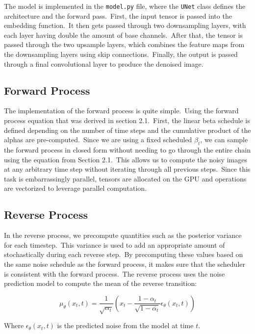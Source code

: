\documentclass[12pt]{article}
\begin{document}
The model is implemented in the \texttt{model.py} file, where the \texttt{UNet} class defines the architecture and the forward pass.\
First, the input tensor is passed into the embedding function.\
It then gets passed through two downsampling layers, with each layer having double the amount of base channels.\
After that, the tensor is passed through the two upsample layers, which combines the feature maps from the downsampling layers using skip connections.\
Finally, the output is passed through a final convolutional layer to produce the denoised image.\

\subsection{Forward Process}

The implementation of the forward process is quite simple.\
Using the forward process equation that was derived in section 2.1.\
First, the linear beta schedule is defined depending on the number of time steps and the cumulative product of the alphas are pre-computed.\
Since we are using a fixed scheduled $\beta_t$, we can sample the forward process in closed form without needing to go through the entire chain using the equation from Section 2.1.\
This allows us to compute the noisy images at any arbitrary time step without iterating through all previous steps.\
Since this task is embarrassingly parallel, tensors are allocated on the GPU and operations are vectorized to leverage parallel computation.\

\subsection{Reverse Process}

In the reverse process, we precompute quantities such as the posterior variance for each timestep.\
This variance is used to add an appropriate amount of stochastically during each reverse step.\
By precomputing these values based on the same noise schedule as the forward process, it makes sure that the scheduler is consistent with the forward process.\
The reverse process uses the noise prediction model to compute the mean of the reverse transition: 

\[{\mu _\theta }({x_t},t) = \frac{1}{{\sqrt {{\alpha _t}} }}({x_t} - \frac{{1 - {\alpha _t}}}{{\sqrt {1 - \overline {{\alpha _t}} } }}{\epsilon _\theta }({x_t},t))\]

Where ${\epsilon _\theta }({x_t},t)$ is the predicted noise from the model at time $t$. \\
\end{document}
